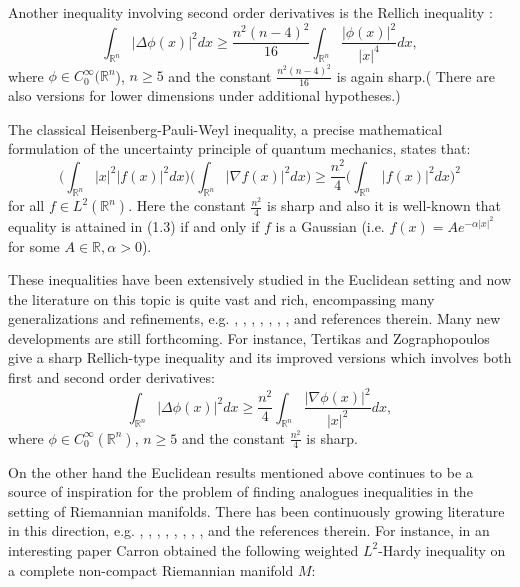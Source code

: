 \documentclass[12pt]{amsart}
\numberwithin{equation}{section}
\numberwithin{theorem}{section}
\numberwithin{theorem}{section} \numberwithin{lemma}{section}
\numberwithin{definition}{section}
\numberwithin{corollary}{section}
\numberwithin{remark}{section}
\numberwithin{proposition}{section}
\begin{document}
Another inequality involving  second order derivatives is the
Rellich inequality \cite{Rellich}:
\begin{equation} \int_{\mathbb{R}^n}|\Delta \phi(x)|^2dx\ge
\frac{n^2(n-4)^2}{16}\int_{\mathbb{R}^n
}\frac{|\phi(x)|^2}{|x|^4}dx,\end{equation} where $\phi\in
C_0^{\infty}(\mathbb{R}^n$), $n \ge 5$ and the constant
$\frac{n^2(n-4)^2}{16}$   is again sharp.( There are also versions
for lower dimensions under additional hypotheses.)

The classical Heisenberg-Pauli-Weyl  inequality, a precise mathematical
formulation of the uncertainty principle of quantum mechanics,
states that:
\begin{equation}
\Big(\int_{\mathbb{R}^n} |x|^2
|f(x)|^2dx\Big)\Big(\int_{\mathbb{R}^n} |\nabla f(x)|^2 dx\Big)\ge
\frac{n^2}{4} \Big(\int_{\mathbb{R}^n} |f(x)|^2 dx \Big)^2
\end{equation}
for all $f\in L^2( \mathbb{R}^n)$. Here the constant $\frac{n^2}{4}$
is sharp and  also it is well-known that equality is attained in
(1.3) if and only if $f$ is a Gaussian (i.e.
$f(x)=Ae^{-\alpha|x|^2}$ for some $A \in \mathbb{R}, \alpha>0$).

These inequalities  have been extensively studied in the Euclidean
setting  and now the literature on this topic is quite vast and
rich, encompassing many generalizations and refinements, e.g. \cite{Allegretto}, 
\cite{Folland-Sitaram}, \cite{Brezis}, \cite{Adimurthi},
\cite{Barbatis-Filippas-Tertikas}, \cite{Moradifam-1}, \cite{Cowan},
\cite{Moradifam-2}
 and references therein. Many new
developments are still forthcoming. For instance, Tertikas and Zographopoulos \cite{Tertikas} give a  sharp
Rellich-type inequality and its improved versions
which involves both first and  second order derivatives:
\begin{equation}
\int_{\mathbb{R}^n}|\Delta \phi(x)|^2dx\ge
\frac{n^2}{4}\int_{\mathbb{R}^n}\frac{|\nabla \phi(x)|^2}{|x|^2}dx,
\end{equation}
where $\phi\in C_0^{\infty}(\mathbb{R}^n)$, $n\ge 5$ and  the
constant $\frac{n^2}{4}$ is sharp.

On the other hand  the Euclidean results mentioned above continues
to be a source of inspiration for the problem of finding analogues
 inequalities in the setting of Riemannian manifolds. There
has been continuously growing literature in this direction, e.g.
\cite{Carron}, \cite{Davies-Hinz}, \cite{Grillo}, \cite{Barbatis},
\cite{Li-Wang}, \cite{Xia}, \cite{Kombe-Ozaydin}, \cite{Minerbe},
and the references therein. For instance, in an interesting paper
Carron \cite{Carron} obtained the following weighted $L^2$-Hardy
inequality on a complete non-compact Riemannian manifold $M$:
\end{document}
